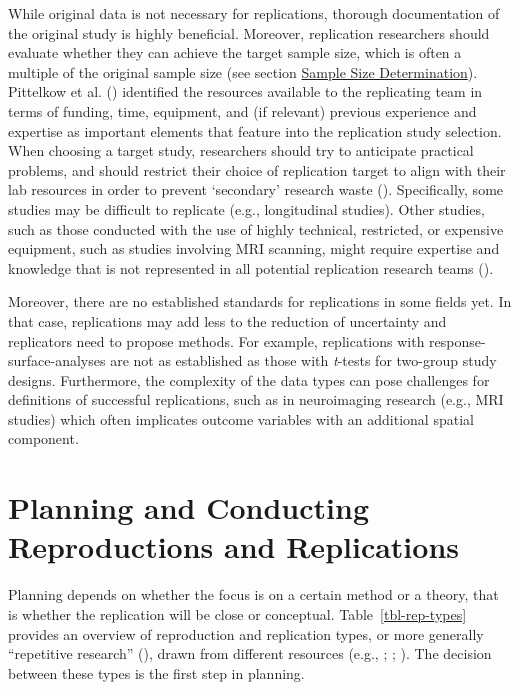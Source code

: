 \documentclass[
  letterpaper,
  DIV=11,
  openany,
  fontsize=12pt,
  parskip=half,
  headings=big,
  numbers=noenddot,
  titlepage=false]{scrreprt}
\begin{document}
While original data is not necessary for replications, thorough
documentation of the original study is highly beneficial. Moreover,
replication researchers should evaluate whether they can achieve the
target sample size, which is often a multiple of the original sample
size (see section \hyperref[heading=h.r1a225ca00xn]{Sample Size
Determination}). Pittelkow et al.
() identified the resources
available to the replicating team in terms of funding, time, equipment,
and (if relevant) previous experience and expertise as important
elements that feature into the replication study selection. When
choosing a target study, researchers should try to anticipate practical
problems, and should restrict their choice of replication target to
align with their lab resources in order to prevent `secondary' research
waste (). Specifically,
some studies may be difficult to replicate (e.g., longitudinal studies).
Other studies, such as those conducted with the use of highly technical,
restricted, or expensive equipment, such as studies involving MRI
scanning, might require expertise and knowledge that is not represented
in all potential replication research teams
().

Moreover, there are no established standards for replications in some
fields yet. In that case, replications may add less to the reduction of
uncertainty and replicators need to propose methods. For example,
replications with response-surface-analyses are not as established as
those with \emph{t}-tests for two-group study designs. Furthermore, the
complexity of the data types can pose challenges for definitions of
successful replications, such as in neuroimaging research (e.g., MRI
studies) which often implicates outcome variables with an additional
spatial component.

\chapter{Planning and Conducting Reproductions and
Replications}\label{planning-and-conducting-reproductions-and-replications}

Planning depends on whether the focus is on a certain method or a
theory, that is whether the replication will be close or conceptual.
Table~\ref{tbl-rep-types} provides an overview of reproduction and
replication types, or more generally ``repetitive research''
(), drawn from different resources
(e.g., ; ; ). The decision between these types is the first step in planning.
\end{document}
